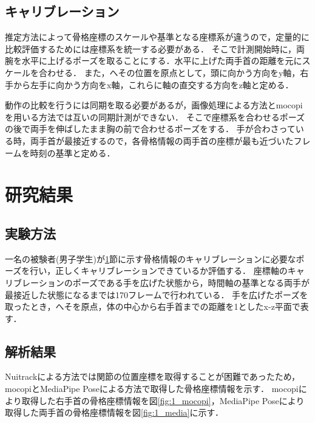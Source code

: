 \documentclass[a4j, fleqn, 12pt]{jsreport}
\begin{document}
\clearpage
\section{キャリブレーション}\label{kyari}
推定方法によって骨格座標のスケールや基準となる座標系が違うので，定量的に比較評価するためには座標系を統一する必要がある．
そこで計測開始時に，両腕を水平に上げるポーズを取ることにする．水平に上げた両手首の距離を元にスケールを合わせる．
また，へその位置を原点として，頭に向かう方向をy軸，右手から左手に向かう方向をx軸，これらに軸の直交する方向をz軸と定める．

動作の比較を行うには同期を取る必要があるが，画像処理による方法とmocopiを用いる方法では互いの同期計測ができない．
そこで座標系を合わせるポーズの後で両手を伸ばしたまま胸の前で合わせるポーズをする．
手が合わさっている時，両手首が最接近するので，各骨格情報の両手首の座標が最も近づいたフレームを時刻の基準と定める．

\chapter{研究結果}
\section{実験方法}
一名の被験者(男子学生)が\ref{kyari}節に示す骨格情報のキャリブレーションに必要なポーズを行い，正しくキャリブレーションできているか評価する．
座標軸のキャリブレーションのポーズである手を広げた状態から，時間軸の基準となる両手が最接近した状態になるまでは170フレームで行われている．
手を広げたポーズを取ったとき，へそを原点，体の中心から右手首までの距離を1としたx-z平面で表す．
\section{解析結果}
Nuitrackによる方法では関節の位置座標を取得することが困難であったため，mocopiとMediaPipe Poseによる方法で取得した骨格座標情報を示す．
mocopiにより取得した右手首の骨格座標情報を図\ref{fig:1_mocopi}，MediaPipe Poseにより取得した両手首の骨格座標情報を図\ref{fig:1_media}に示す．
\end{document}
